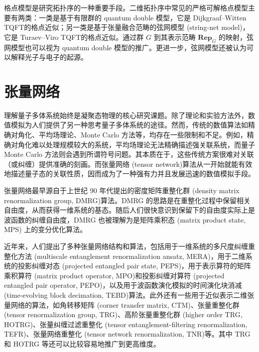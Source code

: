 格点模型是研究拓扑序的一种重要手段。二维拓扑序中常见的严格可解格点模型主要有两类：一类是基于有限群的 quantum double 模型\cite{kitaev2003fault,kitaev2006anyons}，它是 Dijkgraaf--Witten TQFT\cite{dijkgraaf1990topological}的格点近似；另一类是基于张量融合范畴的弦网模型 (string-net model)\cite{levin2005string}，它是 Turaev--Viro TQFT\cite{turaev1992state,kirillov2011string}的格点近似。通过群 $G$ 到其表示范畴 $\mathbf{Rep}_G$ 的映射，弦网模型也可以视为 quantum double 模型的推广\cite{buerschaper2009mapping,buerschaper2013electric}。更进一步，弦网模型还被认为可以解释光子与电子的起源\cite{levin2005colloquium}。

\section{张量网络}

理解量子多体系统始终是凝聚态物理的核心研究课题。除了理论和实验方法外，数值模拟为人们提供了另一种思考量子多体系统的途径。然而，传统的数值算法如精确对角化、平均场理论、Monte Carlo 方法等，均存在一些限制和不足。例如，精确对角化难以处理规模较大的系统，平均场理论无法精确描述强关联系统，而量子 Monte Carlo 方法则会遇到所谓符号问题。其本质在于，这些传统方案很难对关联（或纠缠）提供准确的刻画。而张量网络 (tensor network)\cite{orus2014practical,bridgeman2017hand,biamonte2017tensor,orus2019tensor,ran2020tensor,evenbly2022practical}算法从一开始就能有效地描述量子态的关联性质，因而成为了一种强有力并且发展迅速的数值模拟手段。

张量网络最早源自于上世纪 90 年代提出的密度矩阵重整化群 (density matrix renormalization group, DMRG)\cite{white1992density,white1993density,schollwock2005density}算法。DMRG 的思路是在重整化过程中保留相关自由度，从而获得一维系统的基态。随后人们很快意识到保留下的自由度实际上是波函数的纠缠自由度，DMRG 也被理解为是矩阵乘积态 (matrix product state, MPS) 上的变分优化算法\cite{mcculloch2007density,perez2007matrix,verstraete2008matrix,schollwock2011density}。

近年来，人们提出了多种张量网络结构和算法，包括用于一维系统的多尺度纠缠重整化方法 (multiscale entanglement renormalization ansatz, MERA)\cite{vidal2007entanglement,evenbly2009algorithms,evenbly2014algorithms}，用于二维系统的投影纠缠对态 (projected entangled pair state, PEPS)\cite{verstraete2004renormalization}，用于表示算符的矩阵乘积算符 (matrix product operator, MPO)\cite{pirvu2010matrix}和投影纠缠对算符 (projected entangled pair operator, PEPO)\cite{czarnik2015variational}，以及用于波函数演化模拟的时间演化块消减 (time-evolving block decimation, TEBD)\cite{vidal2003efficient,vidal2004efficient,vidal2007classical,orus2008infinite}算法。此外还有一些用于近似表示二维张量网络的算法，如角转移矩阵 (corner transfer matrix, CTM)\cite{nishino1996corner,orus2012exploring}、张量重整化群 (tensor renormalization group, TRG)\cite{levin2007tensor}、高阶张量重整化群 (higher order TRG, HOTRG)\cite{xie2012coarse}、张量纠缠过滤重整化 (tensor entanglement-filtering renormalization, TEFR)\cite{gu2009tensor1}、张量网络重整化 (tensor network renormalization, TNR)\cite{evenbly2015tensor1,evenbly2017algorithms}\allowbreak 等。其中 TRG 和 HOTRG 等还可以比较容易地推广到更高维度。

